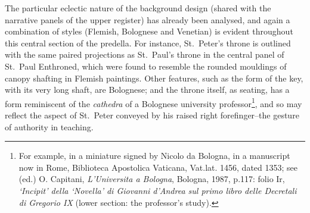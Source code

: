 \documentclass[a4paper,12pt]{article}
\begin{document}
The particular eclectic nature of the background design (shared with
the narrative panels of the upper register) has already been analysed,
and again a combination of styles (Flemish, Bolognese and Venetian) is
evident throughout this central section of the predella. For instance,
St.~Peter's throne is outlined with the same paired projections as
St.~Paul's throne in the central panel of St.~Paul Enthroned, which
were found to resemble the rounded mouldings of canopy shafting in
Flemish paintings. Other features, such as the form of the key, with
its very long shaft, are Bolognese; and the throne itself, as seating,
has a form reminiscent of the \textit{cathedra} of a Bolognese
university professor\footnote{For example, in a miniature signed by
Nicolo da Bologna, in a manuscript now in Rome, Biblioteca Apostolica
Vaticana, Vat.lat. 1456, dated 1353; see (ed.) O. Capitani,
\textit{L'Universita a Bologna}, Bologna, 1987, p.117: folio Ir,
\textit{`Incipit' della `Novella' di Giovanni d'Andrea sul primo libro
delle Decretali di Gregorio IX} (lower section: the professor's
study).}, and so may reflect the aspect of St.~Peter conveyed by his
raised right forefinger--the gesture of authority in teaching.
\end{document}
